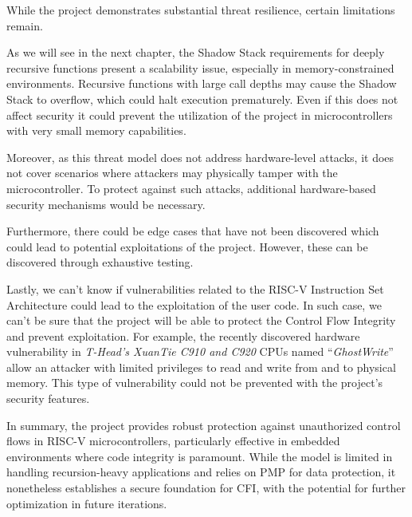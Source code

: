 While the project demonstrates substantial threat resilience, certain
limitations remain.

As we will see in the next chapter, the Shadow Stack requirements for deeply recursive
functions present a scalability issue, especially in memory-constrained
environments. Recursive functions with large call depths may cause the Shadow Stack
to overflow, which could halt execution prematurely. Even if this does not affect
security it could prevent the utilization of the project in microcontrollers with
very small memory capabilities.

Moreover, as this threat model does not address hardware-level attacks, it does not
cover scenarios where attackers may physically tamper with the microcontroller.
To protect against such attacks, additional hardware-based security mechanisms would
be necessary.

Furthermore, there could be edge cases that have not been discovered which could
lead to potential exploitations of the project. However, these can be discovered
through exhaustive testing.

Lastly, we can't know if vulnerabilities related to the RISC-V Instruction Set Architecture
could lead to the exploitation of the user code. In such case, we can't be sure that
the project will be able to protect the Control Flow Integrity and prevent exploitation.
For example, the recently discovered hardware vulnerability in \textit{T-Head's
XuanTie C910 and C920} CPUs named ``\textit{GhostWrite}'' \cite{riscvuzz} allow an
attacker with limited privileges to read and write from and to physical memory.
This type of vulnerability could not be prevented with the project's security
features.

In summary, the project provides robust protection against unauthorized control flows
in RISC-V microcontrollers, particularly effective in embedded environments
where code integrity is paramount. While the model is limited in handling recursion-heavy
applications and relies on PMP for data protection, it nonetheless establishes a
secure foundation for CFI, with the potential for further optimization in future
iterations.
